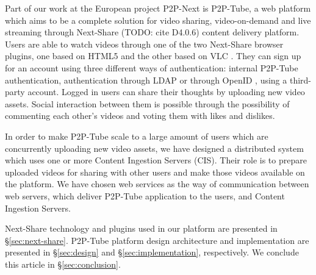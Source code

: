 Part of our work at the European project P2P-Next \cite{p2p-next} is P2P-Tube, a web platform which aims to be a complete solution for video sharing, video-on-demand and live streaming through Next-Share (TODO: cite D4.0.6) content delivery platform. Users are able to watch videos through one of the two Next-Share browser plugins, one based on HTML5 and the other based on VLC \cite{vlc}. They can sign up for an account using three different ways of authentication: internal P2P-Tube authentication, authentication through LDAP \cite{ldap} or through OpenID \cite{openid}, using a third-party account. Logged in users can share their thoughts by uploading new video assets. Social interaction between them is possible through the possibility of commenting each other's videos and voting them with likes and dislikes.

In order to make P2P-Tube scale to a large amount of users which are concurrently uploading new video assets, we have designed a distributed system which uses one or more Content Ingestion Servers (CIS). Their role is to prepare uploaded videos for sharing with other users and make those videos available on the platform. We have chosen web services as the way of communication between web servers, which deliver P2P-Tube application to the users, and Content Ingestion Servers.

Next-Share technology and plugins used in our platform are presented in \S \ref{sec:next-share}. P2P-Tube platform design architecture and implementation are presented in \S \ref{sec:design} and \S \ref{sec:implementation}, respectively. We conclude this article in \S \ref{sec:conclusion}.